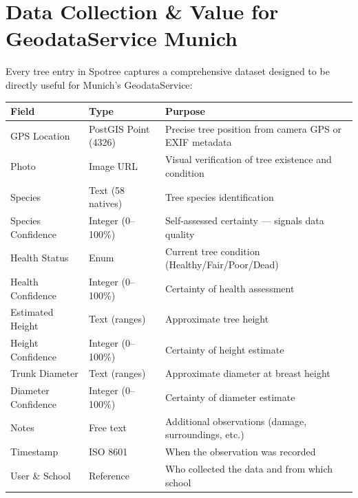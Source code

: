 \documentclass[11pt,a4paper]{article}
\newcommand{\proposalTableStart}{\arrayrulecolor{black}}
\newcommand{\proposalTableHeader}{}
\newcommand{\proposalTableEnd}{\arrayrulecolor{black}}
\begin{document}
\clearpage
\section{Data Collection \& Value for GeodataService Munich}

Every tree entry in Spotree captures a comprehensive dataset designed to be directly useful for Munich's GeodataService:

\begin{center}
\small
\proposalTableStart
\begin{tabularx}{\textwidth}{|>{\raggedright\arraybackslash}p{}|>{\raggedright\arraybackslash}p{}|Y|}
\hline
\proposalTableHeader
\textbf{Field} & \textbf{Type} & \textbf{Purpose} \\
\hline
GPS Location & PostGIS Point (4326) & Precise tree position from camera GPS or EXIF metadata \\
\hline
Photo & Image URL & Visual verification of tree existence and condition \\
\hline
Species & Text (58 natives) & Tree species identification \\
\hline
Species Confidence & Integer (0--100\%) & Self-assessed certainty --- signals data quality \\
\hline
Health Status & Enum & Current tree condition (Healthy/Fair/Poor/Dead) \\
\hline
Health Confidence & Integer (0--100\%) & Certainty of health assessment \\
\hline
Estimated Height & Text (ranges) & Approximate tree height \\
\hline
Height Confidence & Integer (0--100\%) & Certainty of height estimate \\
\hline
Trunk Diameter & Text (ranges) & Approximate diameter at breast height \\
\hline
Diameter Confidence & Integer (0--100\%) & Certainty of diameter estimate \\
\hline
Notes & Free text & Additional observations (damage, surroundings, etc.) \\
\hline
Timestamp & ISO 8601 & When the observation was recorded \\
\hline
User \& School & Reference & Who collected the data and from which school \\
\hline
\end{tabularx}
\proposalTableEnd
\end{center}
\end{document}
